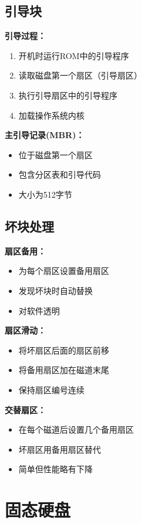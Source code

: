 \documentclass[lang=cn,newtx,10pt,scheme=chinese]{../../elegantbook}
\begin{document}
\subsection{引导块}

\textbf{引导过程：}
\begin{enumerate}
  \item 开机时运行ROM中的引导程序
  \item 读取磁盘第一个扇区（引导扇区）
  \item 执行引导扇区中的引导程序
  \item 加载操作系统内核
\end{enumerate}

\textbf{主引导记录(MBR)：}
\begin{itemize}
  \item 位于磁盘第一个扇区
  \item 包含分区表和引导代码
  \item 大小为512字节
\end{itemize}

\subsection{坏块处理}

\textbf{扇区备用：}
\begin{itemize}
  \item 为每个扇区设置备用扇区
  \item 发现坏块时自动替换
  \item 对软件透明
\end{itemize}

\textbf{扇区滑动：}
\begin{itemize}
  \item 将坏扇区后面的扇区前移
  \item 将备用扇区加在磁道末尾
  \item 保持扇区编号连续
\end{itemize}

\textbf{交替扇区：}
\begin{itemize}
  \item 在每个磁道后设置几个备用扇区
  \item 坏扇区用备用扇区替代
  \item 简单但性能略有下降
\end{itemize}

\section{固态硬盘}
\end{document}
